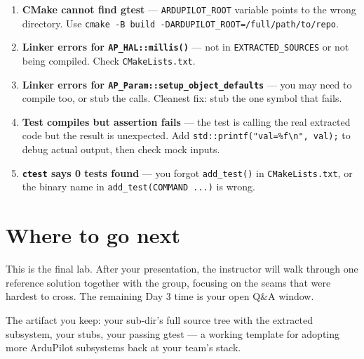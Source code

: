 \documentclass[a4paper,11pt,twoside]{article}
\begin{document}
\begin{enumerate}
  \item \textbf{CMake cannot find gtest} --- \texttt{ARDUPILOT\_ROOT} variable points to the wrong directory. Use \texttt{cmake -B build -DARDUPILOT\_ROOT=/full/path/to/repo}.
  \item \textbf{Linker errors for \texttt{AP\_HAL::millis()}} ---  not in \texttt{EXTRACTED\_SOURCES} or not being compiled. Check \texttt{CMakeLists.txt}.
  \item \textbf{Linker errors for \texttt{AP\_Param::setup\_object\_defaults}} --- you may need to compile  too, or stub the calls. Cleanest fix: stub the one symbol that fails.
  \item \textbf{Test compiles but assertion fails} --- the test is calling the real extracted code but the result is unexpected. Add \texttt{std::printf("val=\%f\textbackslash n", val);} to debug actual output, then check mock inputs.
  \item \textbf{\texttt{ctest} says 0 tests found} --- you forgot \texttt{add\_test()} in \texttt{CMakeLists.txt}, or the binary name in \texttt{add\_test(COMMAND ...)} is wrong.
\end{enumerate}

\section*{Where to go next}

This is the final lab. After your presentation, the instructor will walk through one reference solution together with the group, focusing on the seams that were hardest to cross. The remaining Day 3 time is your open Q\&A window.

The artifact you keep: your sub-dir's full source tree with the extracted subsystem, your stubs, your passing gtest --- a working template for adopting more ArduPilot subsystems back at your team's stack.

\fi
\end{document}
